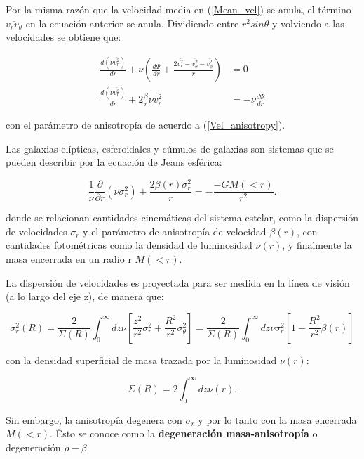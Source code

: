 Por la misma razón que la velocidad media en (\ref{Mean_vel}) se anula, el término $\overline{v_r v_\theta}$ en la ecuación anterior se anula. Dividiendo entre $r^2 sin \theta$ y volviendo a las velocidades se obtiene que:

\begin{align}
\frac{d (\nu \overline{v_r^2})}{dr} + \nu \left ( \frac{d \Psi}{d r} + \frac{2 \overline{v_r^2}-\overline{v_\theta^2}-\overline{v_\phi^2}}{r} \right ) & = 0 \\
\frac{d (\nu \overline{v_r^2})}{dr}  + 2 \frac{\beta}{r} \nu \overline{v_r^2} & = - \nu \frac{d \Psi}{d r}
\end{align}

con el parámetro de anisotropía de acuerdo a (\ref{Vel_anisotropy}).


Las galaxias elípticas, esferoidales y cúmulos de galaxias son sistemas que se pueden describir por la ecuación de Jeans esférica:

\begin{equation}
\frac{1}{\nu} \frac{\partial }{\partial r} (\nu \sigma_r^2) + \frac{2\beta(r)\sigma_r^2}{r} = -\frac{-GM (<r)}{r^2}.
\end{equation}

donde se relacionan cantidades cinemáticas del sistema estelar, como la dispersión de velocidades $\sigma_r$ y el parámetro de anisotropía de velocidad $\beta(r)$, con cantidades fotométricas como la densidad de luminosidad $\nu(r)$, y finalmente la masa encerrada en un radio r $M (<r)$. 

La dispersión de velocidades es proyectada para ser medida en la línea de visión (a lo largo del eje z), de manera que:

\begin{equation}
\sigma_r^2(R) = \frac{2}{\Sigma (R)} \int_0^{\infty} dz \nu \left [ \frac{z^2}{r^2}\sigma_r^2 + \frac{R^2}{r^2} \sigma_{\theta}^2 \right ] = \frac{2}{\Sigma (R)} \int_0^{\infty} dz \nu \sigma_r^2  \left [ 1- \frac{R^2}{r^2} \beta (r) \right ]
\end{equation}

con la densidad superficial de masa trazada por la luminosidad $\nu(r)$:

\begin{equation}
\Sigma (R) = 2 \int_0^{\infty} dz \nu (r).
\end{equation}

Sin embargo, la anisotropía degenera con $\sigma_r$ y por  lo tanto con la masa encerrada $M(<r)$. Ésto se conoce como la \textbf{degeneración masa-anisotropía} o degeneración $\rho - \beta$.


